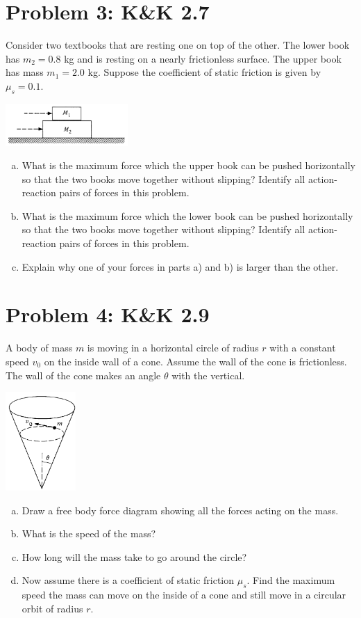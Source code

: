 \documentclass[problems]{esg8012pset}
\begin{document}
\section*{Problem 3: K\&K 2.7}
  Consider two textbooks that are resting one on top of the other. The lower book has $m_2 = 0.8$ kg and is resting on a nearly frictionless surface. The upper book has mass $m_1 = 2.0$ kg. Suppose the coefficient of static friction is given by $\mu_s = 0.1$.
  \begin{center}\includegraphics[width=0.35\textwidth]{ps02_2}\end{center}
  \begin{enumerate}[a)]
    \item What is the maximum force which the upper book can be pushed horizontally so that the two books move together without slipping? Identify all action-reaction pairs of forces in this problem.
    \item What is the maximum force which the lower book can be pushed horizontally so that the two books move together without slipping? Identify all action-reaction pairs of forces in this problem.
    \item Explain why one of your forces in parts a) and b) is larger than the other.
  \end{enumerate}
\section*{Problem 4: K\&K 2.9}
  A body of mass $m$ is moving in a horizontal circle of radius $r$ with a constant speed $v_0$ on the inside wall of a cone. Assume the wall of the cone is frictionless. The wall of the cone makes an angle $\theta$ with the vertical.
  \begin{center}\includegraphics[width=0.2\textwidth]{ps02_3}\end{center}
  \begin{enumerate}[a)]
    \item Draw a free body force diagram showing all the forces acting on the mass.
    \item What is the speed of the mass?
    \item How long will the mass take to go around the circle?
    \item Now assume there is a coefficient of static friction $\mu_s$. Find the maximum speed the mass can move on the inside of a cone and still move in a circular orbit of radius $r$.
  \end{enumerate}
\end{document}
